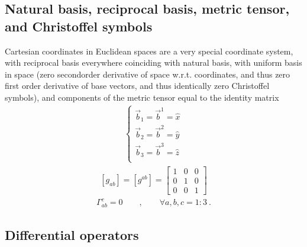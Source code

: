 \documentclass[letterpaper,10pt,english]{jupyterBook}
\begin{document}
\subsection{Natural basis, reciprocal basis, metric tensor, and Christoffel symbols}
\label{\detokenize{ch/tensor-algebra-calculus/calculus-euclidean-cartesian:natural-basis-reciprocal-basis-metric-tensor-and-christoffel-symbols}}\label{\detokenize{ch/tensor-algebra-calculus/calculus-euclidean-cartesian:tensor-calculus-cartesian-metric}}
\sphinxAtStartPar
Cartesian coordinates in Euclidean spaces are a very special coordinate system, with reciprocal basis everywhere coinciding with natural basis, with uniform basis in space (zero second\sphinxhyphen{}order derivative of space w.r.t. coordinates, and thus zero first order derivative of base vectors, and thus identically zero Christoffel symbols), and components of the metric tensor equal to the identity matrix
\begin{equation*}
\begin{split}\begin{cases}
  \vec{b}_1 = \vec{b}^1 = \hat{x} \\
  \vec{b}_2 = \vec{b}^2 = \hat{y} \\
  \vec{b}_3 = \vec{b}^3 = \hat{z} \\
\end{cases}\end{split}
\end{equation*}\begin{equation*}
\begin{split}\left[g_{ab} \right] = \left[ g^{ab} \right] = \begin{bmatrix} 1 & 0 & 0 \\ 0 & 1 & 0 \\ 0 & 0 & 1 \end{bmatrix}\end{split}
\end{equation*}\begin{equation*}
\begin{split}\Gamma_{ab}^c = 0 \qquad , \qquad \forall a,b,c = 1:3 \ .\end{split}
\end{equation*}

\subsection{Differential operators}
\label{\detokenize{ch/tensor-algebra-calculus/calculus-euclidean-cartesian:differential-operators}}\label{\detokenize{ch/tensor-algebra-calculus/calculus-euclidean-cartesian:tensor-calculus-cartesian-differential-operators}}
\end{document}
